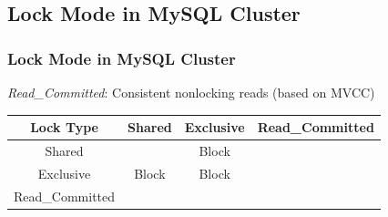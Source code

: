 \documentclass{beamer}
\begin{document}
\subsection{Lock Mode in MySQL Cluster}
\begin{frame}
	\frametitle{Lock Mode in MySQL Cluster}
	\textit{Read\_Committed}: Consistent nonlocking reads (based on MVCC)
\begin{table}[h]
	\centering
	\begin{tabular}{|c|c|c|c|}
		\hline
		\textbf{Lock Type} & \textbf{Shared} & \textbf{Exclusive} & \textbf{Read\_Committed} \\ \hline
		Shared             & \checkmark               & Block              & \checkmark                        \\ \hline
		Exclusive          & Block           & Block              & \checkmark                        \\ \hline
		Read\_Committed    & \checkmark               &            \checkmark        & \checkmark                        \\ \hline
	\end{tabular}
\end{table}
\end{frame}
\end{document}
